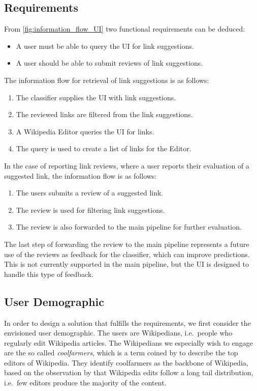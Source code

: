 \subsection{Requirements}\label{sec:uireqs}

From \cref{fig:information_flow_UI} two functional requirements can be deduced:

\begin{itemize}
	\item A user must be able to query the UI for link suggestions.
	\item A user should be able to submit reviews of link suggestions.
\end{itemize}

The information flow for retrieval of link suggestions is as follows:
\begin{enumerate}
	\item The classifier supplies the UI with link suggestions.
	\item The reviewed links are filtered from the link suggestions.
	\item A Wikipedia Editor queries the UI for links.
	\item The query is used to create a list of links for the Editor.
\end{enumerate}

In the case of reporting link reviews, where a user reports their evaluation of a suggested link, the information flow is as follows:

\begin{enumerate}
	\item The users submits a review of a suggested link.
	\item The review is used for filtering link suggestions.
	\item The review is also forwarded to the main pipeline for further evaluation.
\end{enumerate}

The last step of forwarding the review to the main pipeline represents a future use of the reviews as feedback for the classifier, which can improve predictions. This is not currently supported in the main pipeline, but the UI is designed to handle this type of feedback.


\subsection{User Demographic}

In order to design a solution that fulfills the requirements, we first consider the envisioned user demographic. The users are Wikipedians, i.e.\ people who regularly edit Wikipedia articles. The Wikipedians we especially wish to engage are the so called \emph{coolfarmers}, which is a term coined by \textcite{coolfarming} to describe the top editors of Wikipedia. They identify coolfarmers as the backbone of Wikipedia, based on the observation by \textcite{Priedhorsky:2007:CDR:1316624.1316663} that Wikipedia edits follow a long tail distribution, i.e.\ few editors produce the majority of the content.

